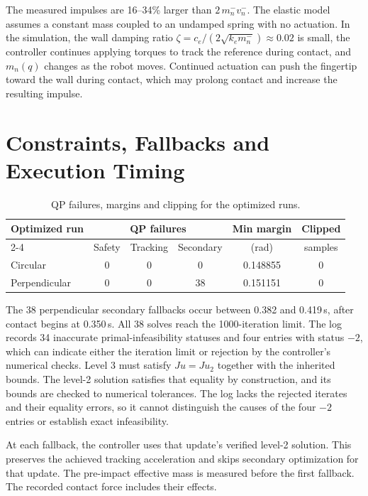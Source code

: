 \documentclass[12pt,a4paper]{article}
\newcommand{\ms}{m_n^-}
\newcommand{\vs}{v_n^-}
\begin{document}
The measured impulses are 16--34\% larger than $2\,\ms \vs$. The elastic model
assumes a constant mass coupled to an undamped spring with no actuation.
In the simulation, the wall damping ratio
$\zeta = c_e/(2\sqrt{k_e \ms}) \approx 0.02$ is small, the controller continues
applying torques to track the reference during contact, and $m_n(q)$ changes
as the robot moves. Continued actuation can push the fingertip toward the wall
during contact, which may prolong contact and increase the resulting impulse.

\section{Constraints, Fallbacks and Execution Timing}

\begin{table}[htbp]
  \centering
  \begin{tabular}{lccccc}
    \toprule
    Optimized run & \multicolumn{3}{c}{QP failures} & Min margin & Clipped \\
    \cmidrule(lr){2-4}
                  & Safety & Tracking & Secondary & (rad) & samples \\
    \midrule
    Circular      & 0 & 0 & 0  & 0.148855 & 0 \\
    Perpendicular & 0 & 0 & 38 & 0.151151 & 0 \\
    \bottomrule
  \end{tabular}
  \caption{QP failures, margins and clipping for the optimized runs.}
  \label{tab:qp}
\end{table}

The 38 perpendicular secondary fallbacks occur between 0.382 and 0.419\,s,
after contact begins at 0.350\,s. All 38 solves reach the 1000-iteration limit.
The log records 34 inaccurate primal-infeasibility statuses
and four entries with status $-2$, which can indicate either the iteration
limit or rejection by the controller's numerical checks. Level 3 must
satisfy $Ju=Ju_2$ together with the inherited bounds. The level-2 solution
satisfies that equality by construction, and its bounds are checked to
numerical tolerances. The log lacks the rejected iterates and their equality
errors, so it cannot distinguish the causes of the four $-2$ entries or
establish exact infeasibility.

At each fallback, the controller uses that update's verified level-2 solution.
This preserves the achieved tracking acceleration and skips secondary
optimization for that update. The pre-impact effective mass is measured before
the first fallback. The recorded contact force includes their effects.
\end{document}
